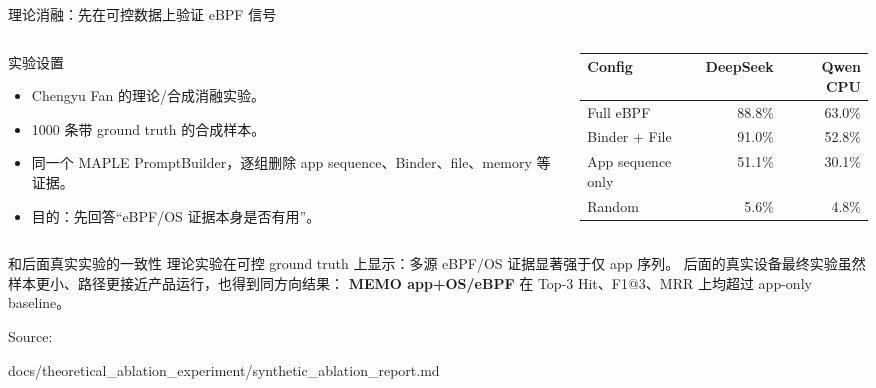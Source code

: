\documentclass[UTF8,aspectratio=169,10pt]{ctexbeamer}
\newcommand{\sourcefoot}[1]{%
  \vfill
  {\scriptsize\textcolor{memoGray}{Source: }%
  \parbox[t]{0.84\textwidth}{\raggedright\ttfamily\scriptsize #1}}%
}
\begin{document}
\begin{frame}{理论消融：先在可控数据上验证 eBPF 信号}
  \begin{columns}[T,totalwidth=\textwidth]
    \begin{column}{0.52\textwidth}
      \begin{block}{实验设置}
        \begin{itemize}
          \item Chengyu Fan 的理论/合成消融实验。
          \item 1000 条带 ground truth 的合成样本。
          \item 同一个 MAPLE PromptBuilder，逐组删除 app sequence、Binder、file、memory 等证据。
          \item 目的：先回答“eBPF/OS 证据本身是否有用”。
        \end{itemize}
      \end{block}
    \end{column}
    \begin{column}{0.44\textwidth}
      \scriptsize
      \begin{tabular}{lrr}
        \toprule
        Config & DeepSeek & Qwen CPU \\
        \midrule
        Full eBPF & 88.8\% & 63.0\% \\
        Binder + File & 91.0\% & 52.8\% \\
        App sequence only & 51.1\% & 30.1\% \\
        Random & 5.6\% & 4.8\% \\
        \bottomrule
      \end{tabular}
      \vspace{0.6em}

    \end{column}
  \end{columns}
  \vspace{0.5em}
  \begin{alertblock}{和后面真实实验的一致性}
    理论实验在可控 ground truth 上显示：多源 eBPF/OS 证据显著强于仅 app 序列。
    后面的真实设备最终实验虽然样本更小、路径更接近产品运行，也得到同方向结果：
    \textbf{MEMO app+OS/eBPF} 在 Top-3 Hit、F1@3、MRR 上均超过 app-only baseline。
  \end{alertblock}
  \sourcefoot{docs/theoretical\_ablation\_experiment/synthetic\_ablation\_report.md}
\end{frame}
\end{document}
